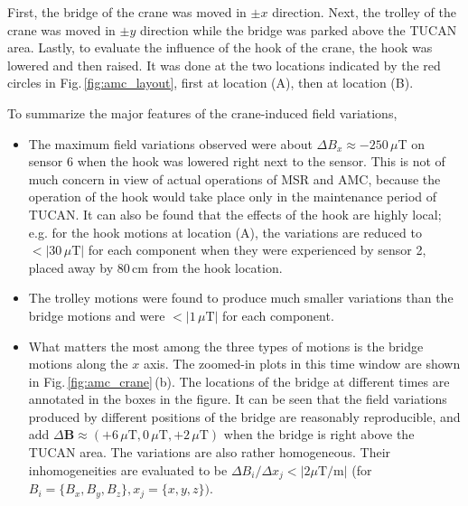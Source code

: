  First, the bridge of the crane was moved in $\pm x$ direction. Next, the trolley of the crane was moved in $\pm y$ direction while the bridge was parked above the TUCAN area. Lastly, to evaluate the influence of the hook of the crane, the hook was lowered and then raised. It was done at the two locations indicated by the red circles in Fig.\,\ref{fig:amc_layout}, first at  location (A), then at  location (B). 

To summarize the major features of the crane-induced field variations,
\begin{itemize}
\item The maximum field variations observed were about $\Delta B_{x}\approx -250\,\mu$T on sensor 6 when the hook was lowered right next to the sensor. This is not of much concern in view of actual operations of MSR and AMC, because the operation of the hook would take place only in the maintenance period of TUCAN. It can also be found that the effects of the hook are highly local; e.g. for the hook motions at location (A), the variations are reduced to $<\left|30\,\mu\mathrm{T}\right|$ for each component when they were experienced by sensor 2, placed away by 80\,cm from the hook location.
\item The trolley motions were found to produce much smaller variations than the bridge motions and were $<|1\,\mu\mathrm{T}|$ for each component. 
\item What matters the most among the three types of motions is the bridge motions along the $x$ axis. The zoomed-in plots in this time window are shown in Fig.\,\ref{fig:amc_crane}\,(b). The locations of the bridge at different times are annotated in the boxes in the figure. It can be seen that the field variations produced by different positions of the bridge are reasonably reproducible, and add $\Delta \mathbf{B}\approx (+6\,\mu\mathrm{T}, 0\,\mu\mathrm{T},+2\,\mu\mathrm{T})$ when the bridge is right above the TUCAN area. The variations are also rather homogeneous. Their inhomogeneities are evaluated to be $\Delta B_{i}/\Delta x_{j} < \left|2 \mu \mathrm{T}/ \mathrm{m}\right|$ (for $B_{i}= \{B_{x}, B_{y}, B_{z}\}, x_{j}=\{x,y,z\})$.
\end{itemize}

